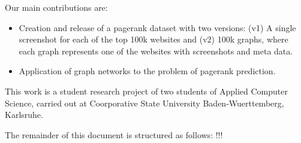 Our main contributions are:
\begin{itemize}
\item Creation and release of a pagerank dataset with two versions: (v1) A single screenshot for each of the top 100k websites and (v2) 100k graphs, where each graph represents one of the websites with screenshots and meta data.
\item Application of graph networks to the problem of pagerank prediction.
\end{itemize}

This work is a student research project of two students of Applied Computer Science, carried out at Coorporative State University Baden-Wuerttemberg, Karlsruhe.

The remainder of this document is structured as follows: !!!
